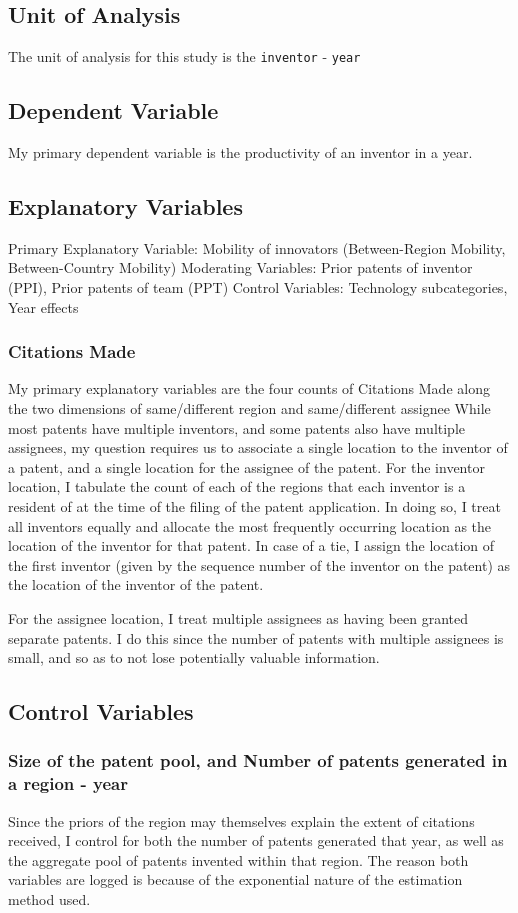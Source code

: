 \documentclass[12pt]{article}
\begin{document}
\subsection{Unit of Analysis}
The unit of analysis for this study is the \verb|inventor| - \verb|year|

\subsection{Dependent Variable}
My primary dependent variable is the productivity of an inventor in a year. 

\subsection{Explanatory Variables}
Primary Explanatory Variable: Mobility of innovators (Between-Region Mobility, Between-Country Mobility)
Moderating Variables: Prior patents of inventor (PPI), Prior patents of team (PPT)
Control Variables: Technology subcategories,  Year effects
\subsubsection{Citations Made}
My primary explanatory variables are the four counts of Citations Made along the two dimensions of same/different region and same/different assignee
While most patents have multiple inventors, and some patents also have multiple assignees, my question requires us to associate a single location to the inventor of a patent, and a single location for the assignee of the patent. For the inventor location, I tabulate the count of each of the regions that each inventor is a resident of at the time of the filing of the patent application. In doing so, I treat all inventors equally and allocate the most frequently occurring location as the location of the inventor for that patent. In case of a tie, I assign the location of the first inventor (given by the sequence number of the inventor on the patent) as the location of the inventor of the patent. 

For the assignee location, I treat multiple assignees as having been granted separate patents. I do this since the number of patents with multiple assignees is small, and so as to not lose potentially valuable information.

\subsection{Control Variables}
\subsubsection{Size of the patent pool, and Number of patents generated in a region - year}
Since the priors of the region may themselves explain the extent of citations received, I control for both the number of patents generated that year, as well as the aggregate pool of patents invented within that region. The reason both variables are logged is because of the exponential nature of the estimation method used.
\end{document}
